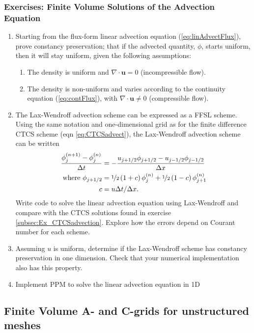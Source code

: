 \subsubsection{Exercises: Finite Volume Solutions of the Advection Equation}\label{subsec:exFvAdvection}
\begin{enumerate}
\item Starting from the flux-form linear advection equation (\ref{eq:linAdvectFlux}),
prove constancy preservation; that if the advected quantity, $\phi$,
starts uniform, then it will stay uniform, given the following assumptions:
\begin{enumerate}
\item The density is uniform and $\nabla\cdot\mathbf{u}=0$ (incompressible
flow).
\item The density is non-uniform and varies according to the continuity
equation (\ref{eq:contFlux}), with $\nabla\cdot\mathbf{u}\ne0$ (compressible
flow).
\end{enumerate}
\item The Lax-Wendroff advection scheme can be expressed as a FFSL scheme.
Using the same notation and one-dimensional grid as for the finite
difference CTCS scheme (eqn \ref{eq:CTCSadvect}), the Lax-Wendroff
advection scheme can be written
\begin{align*}
\frac{\phi_{j}^{(n+1)}-\phi_{j}^{(n)}}{\Delta t} & =-\frac{u_{j+1/2}\phi_{j+1/2}-u_{j-1/2}\phi_{j-1/2}}{\Delta x}\\
\text{where }\phi_{j+1/2} & =\nicefrac{1}{2}\left(1+c\right)\phi_{j}^{(n)}+\nicefrac{1}{2}\left(1-c\right)\phi_{j+1}^{(n)}\\
c & =u\Delta t/\Delta x.
\end{align*}
Write code to solve the linear advection equation using Lax-Wendroff
and compare with the CTCS solutions found in exercise \ref{subsec:Ex_CTCSadvection}.
Explore how the errors depend on Courant number for each scheme. 
\item Assuming $u$ is uniform, determine if the Lax-Wendroff scheme has
constancy preservation in one dimension. Check that your numerical
implementation also has this property.
\item Implement PPM to solve the linear advection equation in 1D 
\end{enumerate}

\subsection{Finite Volume A- and C-grids for unstructured meshes}\label{subsec:FV_AC}

